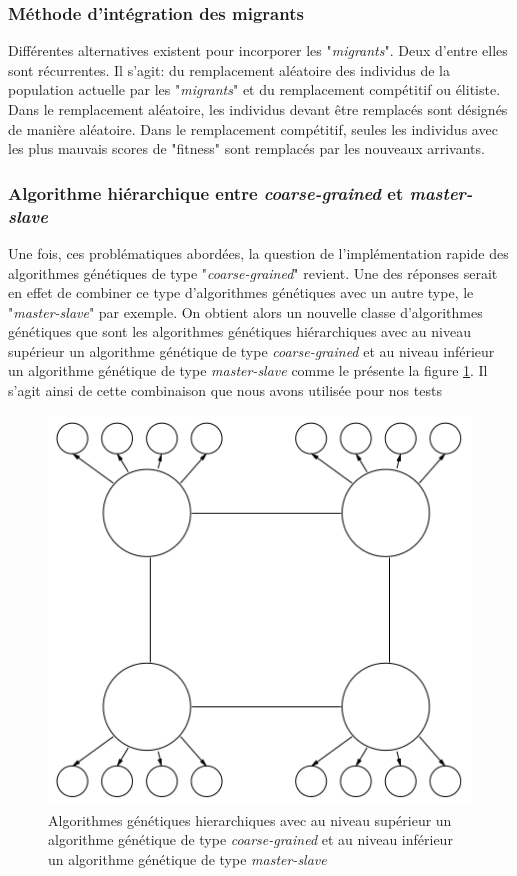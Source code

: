 \documentclass[12pt,a4paper]{article}
\begin{document}
	\subsubsection{Méthode d'intégration des migrants}
 	Différentes alternatives existent pour incorporer les "\emph{migrants}". Deux d'entre elles sont récurrentes. Il s'agit: du remplacement aléatoire des individus de la population actuelle par les "\emph{migrants}" et du remplacement compétitif ou élitiste. Dans le remplacement aléatoire, les individus devant être remplacés sont désignés de manière aléatoire. Dans le remplacement compétitif, seules les individus avec les plus mauvais scores de "fitness" sont remplacés par les nouveaux arrivants. \\
 	\subsubsection{Algorithme hiérarchique entre \emph{coarse-grained} et \emph{master-slave}}
 	\hspace*{.5cm} Une fois, ces problématiques abordées, la question de l'implémentation rapide des algorithmes génétiques de type "\emph{coarse-grained}" revient. Une des réponses serait en effet de combiner ce type d'algorithmes génétiques avec un autre type, le "\emph{master-slave}" par exemple. On obtient alors un nouvelle classe d'algorithmes génétiques que sont les algorithmes génétiques hiérarchiques avec au niveau supérieur un algorithme génétique de type \emph{coarse-grained} et au niveau inférieur un algorithme génétique de type \emph{master-slave} comme le présente la figure \ref{fig:hierarchical_gene1_fig}. Il s'agit ainsi de cette combinaison que nous avons utilisée pour nos tests
 	
	\begin{figure}[!h]
		\begin{center}
			\includegraphics[scale=.3]{img/hierarchical_gene1_fig.png}
			\caption{Algorithmes génétiques hierarchiques avec au niveau supérieur un algorithme génétique de type \emph{coarse-grained} et au niveau inférieur un algorithme génétique de type \emph{master-slave}}
			\label{fig:hierarchical_gene1_fig}
		\end{center}
	\end{figure} 	
 	
\end{document}
